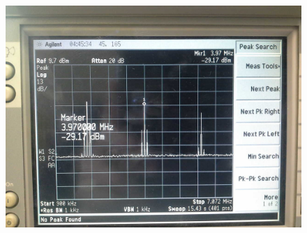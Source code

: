 
\FloatBarrier\begin{figure}[!h]
\centering
\includegraphics[scale=0.25]{../Grafiken/Frequenzspektrum_c_AmpModuliertTraeger_Oberwellen_1.jpg}
\caption{\label{fig:frequenzspektrum_c_ampmodulierttraeger_oberwellen_1}}
\end{figure}
\FloatBarrier